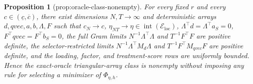 \documentclass{article}
\newtheorem{proposition}{Proposition}
\begin{document}
\begin{proposition}[prop:oracle-class-nonempty]\label{prop:oracle-class-nonempty}
For every fixed \(r\) and every \(c\in(\underline c,\overline c)\), there exist dimensions \(N,T\to\infty\) and deterministic arrays \(d,qvec,a,b,\Lambda,F\) such that \(c_N\to c\), \(\eta_{NT}\to\eta\in\operatorname{int}(\mathcal E_{\mathrm{loc}})\), \(\Lambda^{\top}d=\Lambda^{\top}a_S=0\), \(F^{\top}qvec=F^{\top}b_S=0\), the full Gram limits \(N^{-1}\Lambda^{\top}\Lambda\) and \(T^{-1}F^{\top}F\) are positive definite, the selector-restricted limits \(N^{-1}\Lambda^{\top}M_d\Lambda\) and \(T^{-1}F^{\top}M_{qvec}F\) are positive definite, and the loading, factor, and treatment-score rows are uniformly bounded. Hence the exact-oracle triangular-array class is nonempty without imposing any rule for selecting a minimizer of \(\Phi_{\eta,h}\).
\end{proposition}
\end{document}
